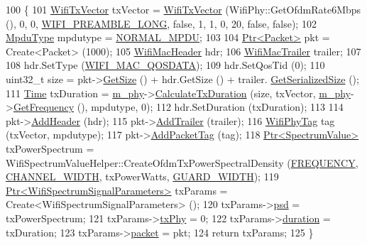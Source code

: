 \begin{DoxyCode}
100 \{
101   \hyperlink{classns3_1_1WifiTxVector}{WifiTxVector} txVector = \hyperlink{classns3_1_1WifiTxVector}{WifiTxVector} (WifiPhy::GetOfdmRate6Mbps (), 0, 0, 
      \hyperlink{group__wifi_gga5e94a56cb338a14ffbbb19c6a41251eba12f3d9468d1630bd38bbef20df1e3eda}{WIFI\_PREAMBLE\_LONG}, \textcolor{keyword}{false}, 1, 1, 0, 20, \textcolor{keyword}{false}, \textcolor{keyword}{false});
102   \hyperlink{namespacens3_ae617d41bbd0c07fa58ee2306f687b055}{MpduType} mpdutype = \hyperlink{namespacens3_ae617d41bbd0c07fa58ee2306f687b055a1fa7c2077d3b19b000b35004914f50eb}{NORMAL\_MPDU};
103 
104   \hyperlink{classns3_1_1Ptr}{Ptr<Packet>} pkt = Create<Packet> (1000);
105   \hyperlink{classns3_1_1WifiMacHeader}{WifiMacHeader} hdr;
106   \hyperlink{classns3_1_1WifiMacTrailer}{WifiMacTrailer} trailer;
107 
108   hdr.SetType (\hyperlink{namespacens3_a9318472db39b35b2092de5c721e6ab0aafd37aea1ac3edba5410fac6367b19b1d}{WIFI\_MAC\_QOSDATA});
109   hdr.SetQosTid (0);
110   uint32\_t size = pkt->\hyperlink{classns3_1_1Packet_a462855c9929954d4301a4edfe55f4f1c}{GetSize} () + hdr.GetSize () + trailer.
      \hyperlink{classns3_1_1WifiMacTrailer_a1f2a6bccf9812442fbaf7a533f41887b}{GetSerializedSize} ();
111   \hyperlink{classns3_1_1Time}{Time} txDuration = \hyperlink{classSpectrumWifiPhyBasicTest_aea1ad31a982e7321017675c050488bd6}{m\_phy}->\hyperlink{classns3_1_1WifiPhy_aee98c7241bb4f0bb8e6d90f5771dacc7}{CalculateTxDuration} (size, txVector, 
      \hyperlink{classSpectrumWifiPhyBasicTest_aea1ad31a982e7321017675c050488bd6}{m\_phy}->\hyperlink{classns3_1_1WifiPhy_ad2508d94faf22d690d6b8b4367934fd1}{GetFrequency} (), mpdutype, 0);
112   hdr.SetDuration (txDuration);
113 
114   pkt->\hyperlink{classns3_1_1Packet_a465108c595a0bc592095cbcab1832ed8}{AddHeader} (hdr);
115   pkt->\hyperlink{classns3_1_1Packet_ae26b490c30ae5bc98be5181ec6e06db8}{AddTrailer} (trailer);
116   \hyperlink{classns3_1_1WifiPhyTag}{WifiPhyTag} tag (txVector, mpdutype);
117   pkt->\hyperlink{classns3_1_1Packet_a7400b8655852f5271c5957250d0141af}{AddPacketTag} (tag);
118   \hyperlink{classns3_1_1Ptr}{Ptr<SpectrumValue>} txPowerSpectrum = 
      WifiSpectrumValueHelper::CreateOfdmTxPowerSpectralDensity (\hyperlink{spectrum-wifi-phy-test_8cc_ad1a292c96f313d36071b5faf0377f606}{FREQUENCY}, \hyperlink{spectrum-wifi-phy-test_8cc_a56c66ac67787ad7c5eebe2556141456d}{CHANNEL\_WIDTH}, txPowerWatts, 
      \hyperlink{spectrum-wifi-phy-test_8cc_a4f70654e6fd5811f04e8797eedd3bf44}{GUARD\_WIDTH});
119   \hyperlink{classns3_1_1Ptr}{Ptr<WifiSpectrumSignalParameters>} txParams = 
      Create<WifiSpectrumSignalParameters> ();
120   txParams->\hyperlink{structns3_1_1SpectrumSignalParameters_afc3b87e914306b069232fda861836051}{psd} = txPowerSpectrum;
121   txParams->\hyperlink{structns3_1_1SpectrumSignalParameters_ab20434042353cbd479e1f9d807f9e37d}{txPhy} = 0;
122   txParams->\hyperlink{structns3_1_1SpectrumSignalParameters_aa97149751dce62c95f523622fd5fbfd3}{duration} = txDuration;
123   txParams->\hyperlink{structns3_1_1WifiSpectrumSignalParameters_a3302ca9118103a1f4f69b1c10dddb979}{packet} = pkt;
124   \textcolor{keywordflow}{return} txParams;
125 \}
\end{DoxyCode}


